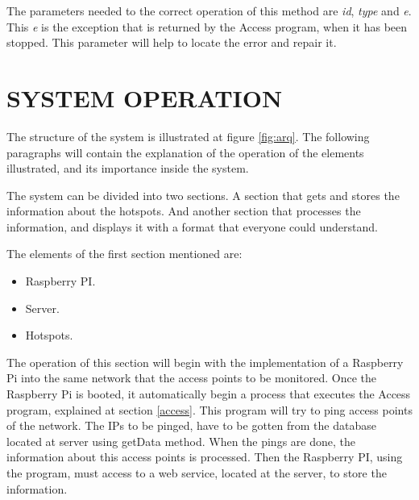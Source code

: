 \documentclass[12pt, a4paper,twoside]{tesi_upf}
\begin{document}
                The parameters needed to the correct operation of this method are \textit{id}, \textit{type} and \textit{e}. This \textit{e} is the exception that is returned by the Access program, when it has been stopped. This parameter will help to locate the error and repair it.
                
 \chapter{SYSTEM OPERATION}
\label{Chapter4}

The structure of the system is illustrated at figure \ref{fig:arq}. The following paragraphs will contain the explanation of the operation of the elements illustrated, and its importance inside the system.
        
        The system can be divided into two sections. A section that gets and stores the information about the hotspots. And another section that processes the information, and displays it with a format that everyone could understand.
                
        The elements of the first section mentioned are: 
        \begin{itemize}
            \item Raspberry PI.
            \item Server.
            \item Hotspots. 
        \end{itemize}
        
        The operation of this section will begin with the implementation of a Raspberry Pi into the same network that the access points to be monitored. Once the Raspberry Pi is booted, it automatically begin a process that executes the Access program, explained at section \ref{access}. This program will try to ping access points of the network. The IPs to be pinged, have to be gotten from the database located at server using getData method. When the pings are done, the information about this access points is processed. Then the Raspberry PI, using the program, must access to a web service, located at the server, to store the information.
        
        
\end{document}
